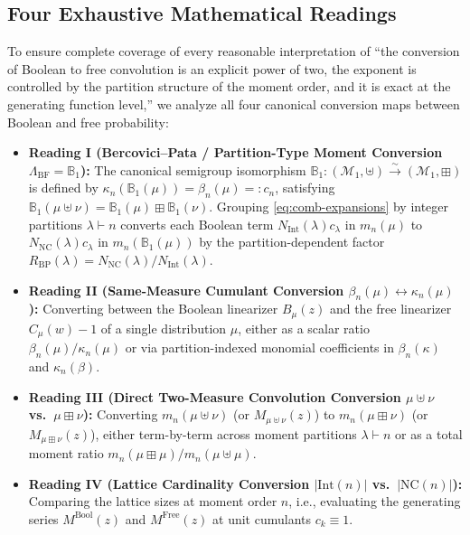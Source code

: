 \documentclass[11pt,a4paper]{article}
\theoremstyle{definition}
\theoremstyle{remark}
\newcommand{\NC}{\mathrm{NC}}
\newcommand{\IntP}{\mathrm{Int}}
\newcommand{\BP}{\mathbb{B}_1}
\begin{document}
\subsection{Four Exhaustive Mathematical Readings}
To ensure complete coverage of every reasonable interpretation of ``the conversion of Boolean to free convolution is an explicit power of two, the exponent is controlled by the partition structure of the moment order, and it is exact at the generating function level,'' we analyze all four canonical conversion maps between Boolean and free probability:
\begin{itemize}
  \item \textbf{Reading I (Bercovici--Pata / Partition-Type Moment Conversion $\Lambda_{\mathrm{BF}} = \BP$):} The canonical semigroup isomorphism $\BP : (\mathcal{M}_1, \uplus) \xrightarrow{\sim} (\mathcal{M}_1, \boxplus)$ \cite{BercoviciPata1999,BelinschiNica2008} is defined by $\kappa_n(\BP(\mu)) = \beta_n(\mu) =: c_n$, satisfying $\BP(\mu \uplus \nu) = \BP(\mu) \boxplus \BP(\nu)$. Grouping \eqref{eq:comb-expansions} by integer partitions $\lambda \vdash n$ converts each Boolean term $N_{\IntP}(\lambda) c_\lambda$ in $m_n(\mu)$ to $N_{\NC}(\lambda) c_\lambda$ in $m_n(\BP(\mu))$ by the partition-dependent factor $R_{\mathrm{BP}}(\lambda) = N_{\NC}(\lambda)/N_{\IntP}(\lambda)$.
  \item \textbf{Reading II (Same-Measure Cumulant Conversion $\beta_n(\mu) \leftrightarrow \kappa_n(\mu)$):} Converting between the Boolean linearizer $B_\mu(z)$ and the free linearizer $C_\mu(w) - 1$ of a single distribution $\mu$, either as a scalar ratio $\beta_n(\mu)/\kappa_n(\mu)$ or via partition-indexed monomial coefficients in $\beta_n(\kappa)$ and $\kappa_n(\beta)$.
  \item \textbf{Reading III (Direct Two-Measure Convolution Conversion $\mu \uplus \nu$ vs.\ $\mu \boxplus \nu$):} Converting $m_n(\mu \uplus \nu)$ (or $M_{\mu \uplus \nu}(z)$) to $m_n(\mu \boxplus \nu)$ (or $M_{\mu \boxplus \nu}(z)$), either term-by-term across moment partitions $\lambda \vdash n$ or as a total moment ratio $m_n(\mu \boxplus \mu)/m_n(\mu \uplus \mu)$.
  \item \textbf{Reading IV (Lattice Cardinality Conversion $|\IntP(n)|$ vs.\ $|\NC(n)|$):} Comparing the lattice sizes at moment order $n$, i.e., evaluating the generating series $M^{\mathrm{Bool}}(z)$ and $M^{\mathrm{Free}}(z)$ at unit cumulants $c_k \equiv 1$.
\end{itemize}
\end{document}
